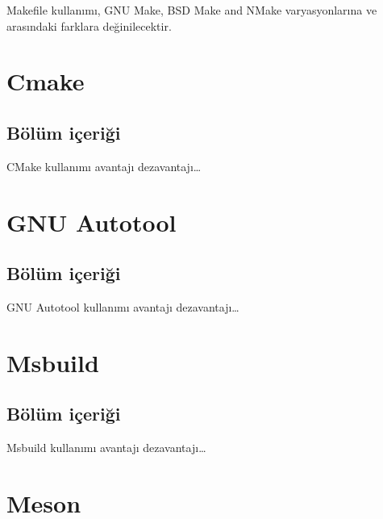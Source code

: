 \documentclass[
]{book}
\begin{document}
Makefile kullanımı, GNU Make, BSD Make and NMake varyasyonlarına ve arasındaki farklara değinilecektir.

\hypertarget{cmake}{%
\chapter*{Cmake}\label{cmake}}

\hypertarget{buxf6luxfcm-iuxe7eriux11fi-2}{%
\section*{Bölüm içeriği}\label{buxf6luxfcm-iuxe7eriux11fi-2}}

CMake kullanımı avantajı dezavantajı\ldots{}

\hypertarget{gnu-autotool}{%
\chapter*{GNU Autotool}\label{gnu-autotool}}

\hypertarget{buxf6luxfcm-iuxe7eriux11fi-3}{%
\section*{Bölüm içeriği}\label{buxf6luxfcm-iuxe7eriux11fi-3}}

GNU Autotool kullanımı avantajı dezavantajı\ldots{}

\hypertarget{msbuild}{%
\chapter*{Msbuild}\label{msbuild}}

\hypertarget{buxf6luxfcm-iuxe7eriux11fi-4}{%
\section*{Bölüm içeriği}\label{buxf6luxfcm-iuxe7eriux11fi-4}}

Msbuild kullanımı avantajı dezavantajı\ldots{}

\hypertarget{meson}{%
\chapter*{Meson}\label{meson}}
\end{document}
